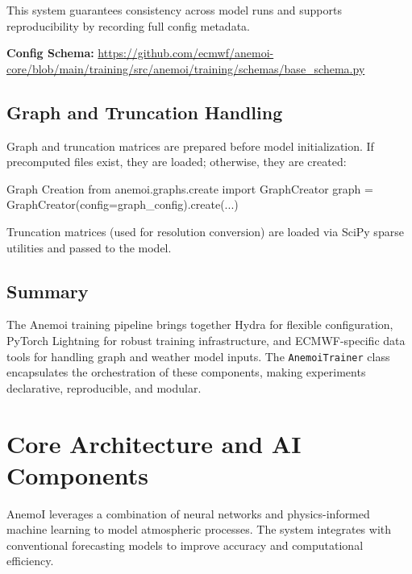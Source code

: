 This system guarantees consistency across model runs and supports reproducibility by recording full config metadata.

{\bf Config Schema:} \url{https://github.com/ecmwf/anemoi-core/blob/main/training/src/anemoi/training/schemas/base_schema.py}


%
\subsection{Graph and Truncation Handling}

Graph and truncation matrices are prepared before model initialization. If precomputed files exist, they are loaded; otherwise, they are created:

\begin{codeonly}{Graph Creation}
from anemoi.graphs.create import GraphCreator
graph = GraphCreator(config=graph_config).create(...)
\end{codeonly}

Truncation matrices (used for resolution conversion) are loaded via SciPy sparse utilities and passed to the model.

%
\subsection{Summary}

The Anemoi training pipeline brings together Hydra for flexible configuration, PyTorch Lightning for robust training infrastructure, and ECMWF-specific data tools for handling graph and weather model inputs. The \texttt{AnemoiTrainer} class encapsulates the orchestration of these components, making experiments declarative, reproducible, and modular.


%
\section{Core Architecture and AI Components}
AnemoI leverages a combination of neural networks and physics-informed machine learning to model atmospheric processes. The system integrates with conventional forecasting models to improve accuracy and computational efficiency.

